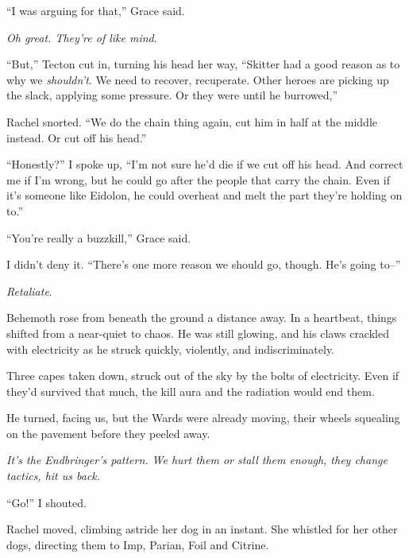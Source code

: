 ``I was arguing for that,'' Grace said.



\emph{Oh great.  They're of like mind}.



``But,'' Tecton cut in, turning his head her way, ``Skitter had a good reason as to why we \emph{shouldn't}.  We need to recover, recuperate.  Other heroes are picking up the slack, applying some pressure.  Or they were until he burrowed,''



Rachel snorted.  ``We do the chain thing again, cut him in half at the middle instead.  Or cut off his head.''



``Honestly?'' I spoke up, ``I'm not sure he'd die if we cut off his head.  And correct me if I'm wrong, but he could go after the people that carry the chain.  Even if it's someone like Eidolon, he could overheat and melt the part they're holding on to.''



``You're really a buzzkill,'' Grace said.



I didn't deny it.  ``There's one more reason we should go, though.  He's going to--''



\emph{Retaliate}.



Behemoth rose from beneath the ground a distance away.  In a heartbeat, things shifted from a near-quiet to chaos.  He was still glowing, and his claws crackled with electricity as he struck quickly, violently, and indiscriminately.



Three capes taken down, struck out of the sky by the bolts of electricity.  Even if they'd survived that much, the kill aura and the radiation would end them.



He turned, facing us, but the Wards were already moving, their wheels squealing on the pavement before they peeled away.



\emph{It's the Endbringer's pattern.  We hurt them or stall them enough, they change tactics, hit us back.}



``Go!'' I shouted.



Rachel moved, climbing astride her dog in an instant.  She whistled for her other dogs, directing them to Imp, Parian, Foil and Citrine.



